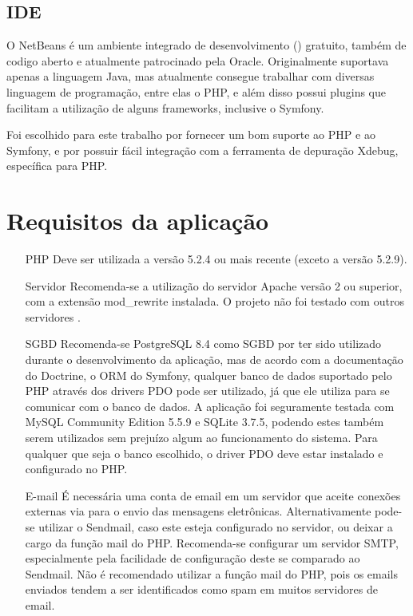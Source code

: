 \subsection{IDE}
O NetBeans é um ambiente integrado de desenvolvimento () gratuito, também de codigo aberto e 
atualmente patrocinado pela Oracle. Originalmente suportava apenas a linguagem Java, mas atualmente
consegue trabalhar com diversas linguagem de programação, entre elas o PHP, e além disso possui plugins
que facilitam a utilização de alguns frameworks, inclusive o Symfony.

Foi escolhido para este trabalho por fornecer um bom suporte ao PHP e ao Symfony, e por possuir fácil
integração com a ferramenta de depuração Xdebug, específica para PHP.

\section{Requisitos da aplicação}

\begin{itemize}
\item[PHP] Deve ser utilizada a versão 5.2.4 ou mais recente (exceto a versão 5.2.9).
\item[Servidor] Recomenda-se a utilização do servidor Apache versão 2 ou superior, com a extensão
mod\_rewrite instalada. O projeto não foi testado com outros servidores .
\item[SGBD] Recomenda-se PostgreSQL 8.4 como SGBD por ter sido utilizado durante o desenvolvimento da aplicação, mas
de acordo com a documentação do Doctrine, o ORM do Symfony, qualquer banco de dados suportado pelo PHP através 
dos drivers PDO pode ser utilizado, já que ele utiliza  para se comunicar com o banco de dados.
A aplicação foi seguramente testada com MySQL Community Edition 5.5.9 e SQLite 3.7.5, podendo estes 
também serem utilizados sem prejuízo algum ao funcionamento do sistema. Para qualquer que seja o
banco escolhido, o driver PDO deve estar instalado e configurado no PHP.
\item[E-mail] É necessária uma conta de email em um servidor que aceite conexões externas via  para
o envio das mensagens eletrônicas. Alternativamente pode-se utilizar o Sendmail, caso este esteja
configurado no servidor, ou deixar a cargo da função mail do PHP. Recomenda-se configurar um
servidor SMTP, especialmente pela facilidade de configura\-ção deste se comparado ao Sendmail. Não 
é recomendado utilizar a função mail do PHP, pois os emails enviados tendem a ser identificados
como spam em muitos servidores de email.
\end{itemize}

